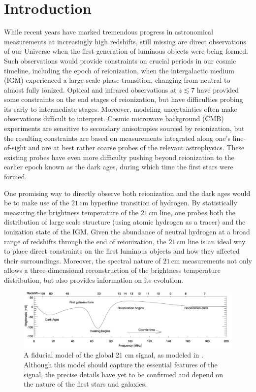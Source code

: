 \documentclass[twocolumn,apj,numberedappendix]{emulateapj}
\begin{document}

\section{Introduction}

While recent years have marked tremendous progress in astronomical measurements at increasingly high redshifts, still missing are direct observations of our Universe when the first generation of luminous objects were being formed. Such observations would provide constraints on crucial periods in our cosmic timeline, including the epoch of reionization, when the intergalactic medium (IGM) experienced a large-scale phase transition, changing from neutral to almost fully ionized. Optical and infrared observations at $z \lesssim 7$ have provided some constraints on the end stages of reionization, but have difficulties probing its early to intermediate stages. Moreover, modeling uncertainties often make observations difficult to interpret. Cosmic microwave background (CMB) experiments are sensitive to secondary anisotropies sourced by reionization, but the resulting constraints are based on measurements integrated along one's line-of-sight and are at best rather coarse probes of the relevant astrophysics. These existing probes have even more difficulty pushing beyond reionization to the earlier epoch known as the dark ages, during which time the first stars were formed.

One promising way to directly observe both reionization and the dark ages would be to make use of the $21\,\textrm{cm}$ hyperfine transition of hydrogen. By statistically measuring the brightness temperature of the $21\,\textrm{cm}$ line, one probes both the distribution of large scale structure (using atomic hydrogen as a tracer) and the ionization state of the IGM. Given the abundance of neutral hydrogen at a broad range of redshifts through the end of reionization, the $21\,\textrm{cm}$ line is an ideal way to place direct constraints on the first luminous objects and how they affected their surroundings. Moreover, the spectral nature of $21\,\textrm{cm}$ measurements not only allows a three-dimensional reconstruction of the brightness temperature distribution, but also provides information on its evolution.


\begin{figure}[!]
	\centering
	\includegraphics[width=1.00\textwidth]{figures/fidModel.png}
	\caption{A fiducial model of the global 21 cm signal, as modeled in \citet{PritchardLoeb2010}. Although this model should capture the essential features of the signal, the precise details have yet to be confirmed and depend on the nature of the first stars and galaxies.}
	\label{fig:21cmSignal}
\end{figure}
\end{document}
